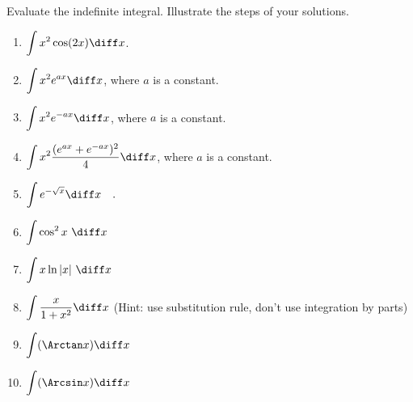 Evaluate the indefinite integral. Illustrate the steps of your solutions.
\begin{multicols}{2}
\begin{enumerate}[ref={\fcProblemRef}]
\item $\displaystyle\int x^2\cos (2x) \diff x$.

\item 
$\displaystyle\int x^2e^{a x} \diff x$, where $a$ is a constant.

\item 
$\displaystyle\int x^2e^{-ax}\diff x$, where $a$ is a constant.

\item \label{problemintx^2(e^(ax)+e^(-ax))^2/4dx}
$\displaystyle\int x^2\frac{(e^{ax}+e^{-ax})^2}4\diff x$, where $a$ is a constant. 

\item \label{problemint(e^(-sqrtx)dx)}
$ \displaystyle 
\int e^{-\sqrt{x}}\diff x\quad .
$

\item 
$\displaystyle\int \cos^2x ~ \diff x$ 

\item 
$\displaystyle \int x\ln |x|  ~ \diff x $

\item $\displaystyle\int \frac{x}{1+x^2} \diff x$  (Hint: use substitution rule, don't use integration by parts)

\item 
$\displaystyle \int (\Arctan x) \diff x$

\item 
$\displaystyle \int (\Arcsin x) \diff x
$


\end{enumerate}
\end{multicols}
